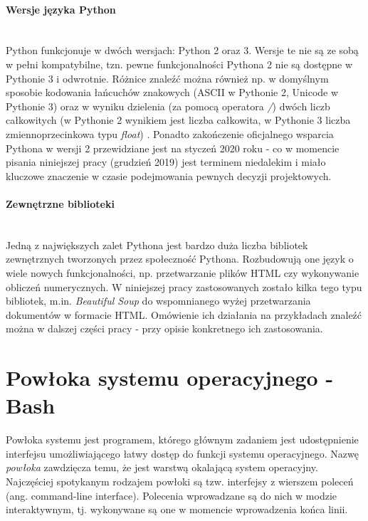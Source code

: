 \paragraph*{Wersje języka Python}\mbox{} \\
Python funkcjonuje w dwóch wersjach: Python 2 oraz 3. Wersje te nie są ze sobą w pełni kompatybilne, tzn. pewne funkcjonalności Pythona 2 nie są dostępne w Pythonie 3 i odwrotnie. Różnice znaleźć można również np. w domyślnym sposobie kodowania łańcuchów znakowych (ASCII w Pythonie 2, Unicode w Pythonie 3) oraz w wyniku dzielenia (za pomocą operatora \textit{/}) dwóch liczb całkowitych (w Pythonie 2 wynikiem jest liczba całkowita, w Pythonie 3 liczba zmiennoprzecinkowa typu \textit{float}) \cite{Python2vs3}. Ponadto zakończenie oficjalnego wsparcia Pythona w wersji 2 przewidziane jest na styczeń 2020 roku \cite{Python2Countdown} - co w momencie pisania niniejszej pracy (grudzień 2019) jest terminem niedalekim i miało kluczowe znaczenie w czasie podejmowania pewnych decyzji projektowych.

\paragraph*{Zewnętrzne biblioteki}\mbox{} \\
Jedną z największych zalet Pythona jest bardzo duża liczba bibliotek zewnętrznych tworzonych przez społeczność Pythona. Rozbudowują one język o wiele nowych funkcjonalności, np. przetwarzanie plików HTML czy wykonywanie obliczeń numerycznych. W niniejszej pracy zastosowanych zostało kilka tego typu bibliotek, m.in. \textit{Beautiful Soup} do wspomnianego wyżej przetwarzania dokumentów w formacie HTML. Omówienie ich działania na przykładach znaleźć można w dalszej części pracy - przy opisie konkretnego ich zastosowania. 


\section{Powłoka systemu operacyjnego - Bash}
Powłoka systemu jest programem, którego głównym zadaniem jest udostępnienie interfejsu umożliwiającego łatwy dostęp do funkcji systemu operacyjnego. Nazwę \textit{powłoka} zawdzięcza temu, że jest warstwą okalającą system operacyjny. Najczęściej spotykanym rodzajem powłoki są tzw. interfejsy z wierszem poleceń (ang. command-line interface). Polecenia wprowadzane są do nich w modzie interaktywnym, tj. wykonywane są one w momencie wprowadzenia końca linii.

